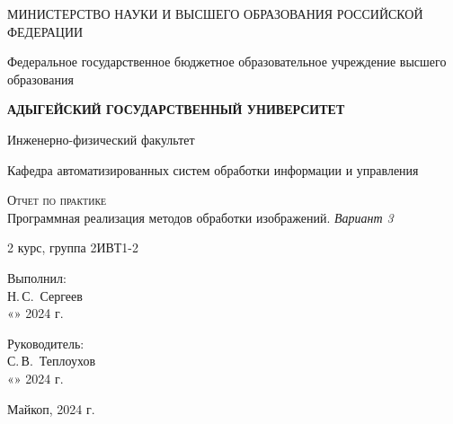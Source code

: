 \documentclass[12pt,a4paper]{scrartcl}
\begin{document}
 \begin{titlepage}
  \begin{center}
   \large
   МИНИСТЕРСТВО НАУКИ И ВЫСШЕГО ОБРАЗОВАНИЯ РОССИЙСКОЙ ФЕДЕРАЦИИ
   
   Федеральное государственное бюджетное образовательное учреждение высшего образования
   
   \textbf{АДЫГЕЙСКИЙ ГОСУДАРСТВЕННЫЙ УНИВЕРСИТЕТ}
   \vspace{0.25cm}
   
   Инженерно-физический факультет
   
   Кафедра автоматизированных систем обработки информации и управления
   \vfill

   \vfill
   
   \textsc{Отчет по практике}\\[5mm]
   
   {\LARGE Программная реализация методов обработки изображений. \textit{Вариант 3}}
   \bigskip
   
   2 курс, группа 2ИВТ1-2
  \end{center}
  \vfill
  
  \newlength{\ML}
  \hfill\begin{minipage}{0.5\textwidth}
   Выполнил:\\
   \underline{\hspace{\ML}} Н.\,С.~Сергеев\\
   «\underline{\hspace{0.7cm}}» \underline{\hspace{2cm}} 2024 г.
  \end{minipage}%
  \bigskip
  
  \hfill\begin{minipage}{0.5\textwidth}
   Руководитель:\\
   \underline{\hspace{\ML}} С.\,В.~Теплоухов\\
   «\underline{\hspace{0.7cm}}» \underline{\hspace{2cm}} 2024 г.
  \end{minipage}%
  \vfill
  
  \begin{center}
   Майкоп, 2024 г.
  \end{center}
 \end{titlepage}
 
\end{document}
